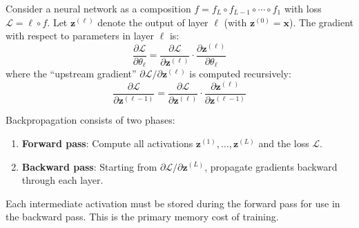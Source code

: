 \begin{theorem}[Backpropagation]
    Consider a neural network as a composition $f = f_L \circ f_{L-1} \circ \cdots \circ f_1$ with loss $\mathcal{L} = \ell \circ f$. Let $\mathbf{z}^{(\ell)}$ denote the output of layer $\ell$ (with $\mathbf{z}^{(0)} = \mathbf{x}$). The gradient with respect to parameters in layer $\ell$ is:
    \[
        \frac{\partial \mathcal{L}}{\partial \theta_\ell} = \frac{\partial \mathcal{L}}{\partial \mathbf{z}^{(\ell)}} \cdot \frac{\partial \mathbf{z}^{(\ell)}}{\partial \theta_\ell}
    \]
    where the ``upstream gradient'' $\partial \mathcal{L}/\partial \mathbf{z}^{(\ell)}$ is computed recursively:
    \[
        \frac{\partial \mathcal{L}}{\partial \mathbf{z}^{(\ell-1)}} = \frac{\partial \mathcal{L}}{\partial \mathbf{z}^{(\ell)}} \cdot \frac{\partial \mathbf{z}^{(\ell)}}{\partial \mathbf{z}^{(\ell-1)}}
    \]
\end{theorem}

\begin{remark}
    Backpropagation consists of two phases:
    \begin{enumerate}
        \item \textbf{Forward pass}: Compute all activations $\mathbf{z}^{(1)}, \ldots, \mathbf{z}^{(L)}$ and the loss $\mathcal{L}$.
        \item \textbf{Backward pass}: Starting from $\partial\mathcal{L}/\partial\mathbf{z}^{(L)}$, propagate gradients backward through each layer.
    \end{enumerate}
    Each intermediate activation must be stored during the forward pass for use in the backward pass. This is the primary memory cost of training.
\end{remark}

